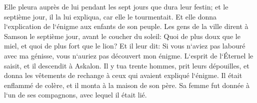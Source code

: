 \verse Elle pleura auprès de lui pendant les sept jours que dura leur festin; et le septième jour, il la lui expliqua, car elle le tourmentait. Et elle donna l`explication de l`énigme aux enfants de son peuple. 
\verse Les gens de la ville dirent à Samson le septième jour, avant le coucher du soleil: Quoi de plus doux que le miel, et quoi de plus fort que le lion? Et il leur dit: Si vous n`aviez pas labouré avec ma génisse, vous n`auriez pas découvert mon énigme. 
\verse L`esprit de l`Éternel le saisit, et il descendit à Askalon. Il y tua trente hommes, prit leurs dépouilles, et donna les vêtements de rechange à ceux qui avaient expliqué l`énigme. Il était enflammé de colère, et il monta à la maison de son père. 
\verse Sa femme fut donnée à l`un de ses compagnons, avec lequel il était lié. 

\chapter{}

